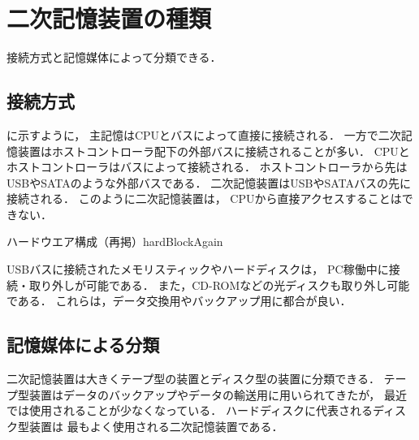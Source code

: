 \section{二次記憶装置の種類}
接続方式と記憶媒体によって分類できる．

\subsection{接続方式}
に示すように，
主記憶はCPUとバスによって直接に接続される．
一方で二次記憶装置はホストコントローラ配下の外部バスに接続されることが多い．
CPUとホストコントローラはバスによって接続される．
ホストコントローラから先はUSBやSATAのような外部バスである．
二次記憶装置はUSBやSATAバスの先に接続される．
このように二次記憶装置は，
CPUから直接アクセスすることはできない．

         {ハードウエア構成（再掲）}{hardBlockAgain}

USBバスに接続されたメモリスティックやハードディスクは，
PC稼働中に接続・取り外しが可能である．
また，CD-ROMなどの光ディスクも取り外し可能である．
これらは，データ交換用やバックアップ用に都合が良い．

\subsection{記憶媒体による分類}
二次記憶装置は大きくテープ型の装置とディスク型の装置に分類できる．
テープ型装置はデータのバックアップやデータの輸送用に用いられてきたが，
最近では使用されることが少なくなっている．
ハードディスクに代表されるディスク型装置は
最もよく使用される二次記憶装置である．

